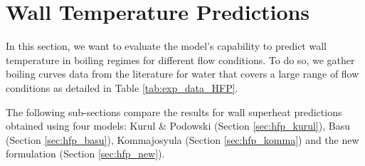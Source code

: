 \npar

\clearpage

\section{Wall Temperature Predictions}
\label{sec:hfp_valid_DTw}

In this section, we want to evaluate the model's capability to predict wall temperature in boiling regimes for different flow conditions. To do so, we gather boiling curves data from the literature for water that covers a large range of flow conditions as detailed in Table \ref{tab:exp_data_HFP}.


\begin{table}[h!]


\noindent{}
\caption{Experimental data range of wall temperature measurements in the boiling region.}
\label{tab:exp_data_HFP}
\end{table}

\npar


The following sub-sections compare the results for wall superheat predictions obtained using four models: Kurul \& Podowski (Section \ref{sec:hfp_kurul}), Basu \etal (Section \ref{sec:hfp_basu}), Kommajosyula (Section \ref{sec:hfp_komma}) and the new formulation (Section \ref{sec:hfp_new}).

